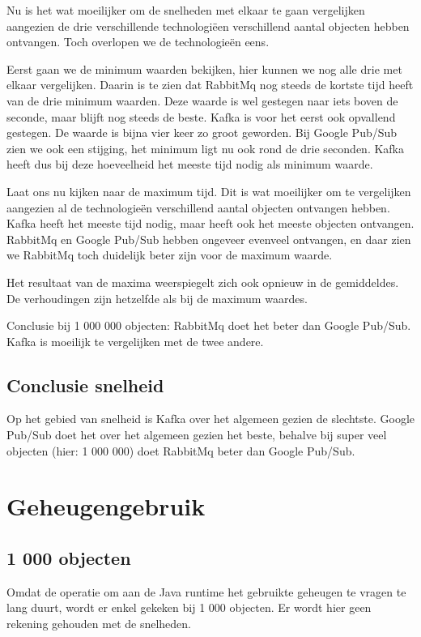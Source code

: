 Nu is het wat moeilijker om de snelheden met elkaar te gaan vergelijken aangezien de drie verschillende technologiëen verschillend aantal objecten hebben ontvangen. Toch overlopen we de technologieën eens.

Eerst gaan we de minimum waarden bekijken, hier kunnen we nog alle drie met elkaar vergelijken. Daarin is te zien dat RabbitMq nog steeds de kortste tijd heeft van de drie minimum waarden. Deze waarde is wel gestegen naar iets boven de seconde, maar blijft nog steeds de beste. Kafka is voor het eerst ook opvallend gestegen. De waarde is bijna vier keer zo groot geworden. Bij Google Pub/Sub zien we ook een stijging, het minimum ligt nu ook rond de drie seconden. Kafka heeft dus bij deze hoeveelheid het meeste tijd nodig als minimum waarde. 

Laat ons nu kijken naar de maximum tijd. Dit is wat moeilijker om te vergelijken aangezien al de technologieën verschillend aantal objecten ontvangen hebben. Kafka heeft het meeste tijd nodig, maar heeft ook het meeste objecten ontvangen. RabbitMq en Google Pub/Sub hebben ongeveer evenveel ontvangen, en daar zien we RabbitMq toch duidelijk beter zijn voor de maximum waarde.

Het resultaat van de maxima weerspiegelt zich ook opnieuw in de gemiddeldes. De verhoudingen zijn hetzelfde als bij de maximum waardes.

Conclusie bij 1 000 000 objecten: RabbitMq doet het beter dan Google Pub/Sub. Kafka is moeilijk te vergelijken met de twee andere.

\subsection{Conclusie snelheid}
Op het gebied van snelheid is Kafka over het algemeen gezien de slechtste. Google Pub/Sub doet het over het algemeen gezien het beste, behalve bij super veel objecten (hier: 1 000 000) doet RabbitMq beter dan Google Pub/Sub.

\section{Geheugengebruik}
\subsection{1 000 objecten}
Omdat de operatie om aan de Java runtime het gebruikte geheugen te vragen te lang duurt, wordt er enkel gekeken bij 1 000 objecten. Er wordt hier geen rekening gehouden met de snelheden.
